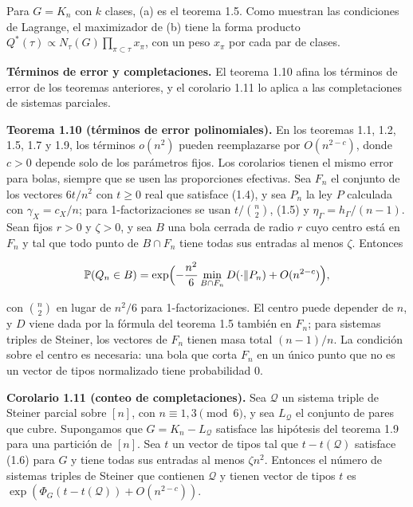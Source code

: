 \documentclass[spanish,11pt,a4paper]{article}
\begin{document}
Para \(G=K_n\) con \(k\) clases, (a) es el teorema 1.5. Como muestran las condiciones de Lagrange, el maximizador de (b) tiene la forma producto \(Q^*(\tau)\propto N_\tau(G)\prod_{\pi\subset\tau}x_\pi\), con un peso \(x_\pi\) por cada par de clases.

\textbf{Términos de error y completaciones.} El teorema 1.10 afina los términos de error de los teoremas anteriores, y el corolario 1.11 lo aplica a las completaciones de sistemas parciales.

\textbf{Teorema 1.10 (términos de error polinomiales).} En los teoremas 1.1, 1.2, 1.5, 1.7 y 1.9, los términos \(o(n^2)\) pueden reemplazarse por \(O(n^{2-c})\), donde \(c>0\) depende solo de los parámetros fijos. Los corolarios tienen el mismo error para bolas, siempre que se usen las proporciones efectivas. Sea \(F_n\) el conjunto de los vectores \(6t/n^2\) con \(t\ge0\) real que satisface (1.4), y sea \(P_n\) la ley \(P\) calculada con \(\gamma_X=c_X/n\); para 1-factorizaciones se usan \(t/\binom n2\), (1.5) y \(\eta_\Gamma=h_\Gamma/(n-1)\). Sean fijos \(r>0\) y \(\zeta>0\), y sea \(B\) una bola cerrada de radio \(r\) cuyo centro está en \(F_n\) y tal que todo punto de \(B\cap F_n\) tiene todas sus entradas al menos \(\zeta\). Entonces

\nopagebreak[4]
\[\mathbb P(Q_n\in B)=\exp\Bigl(-\frac{n^2}{6}\min_{B\cap F_n}D(\cdot\Vert P_n)+O(n^{2-c})\Bigr),\]

con \(\binom n2\) en lugar de \(n^2/6\) para 1-factorizaciones. El centro puede depender de \(n\), y \(D\) viene dada por la fórmula del teorema 1.5 también en \(F_n\); para sistemas triples de Steiner, los vectores de \(F_n\) tienen masa total \((n-1)/n\). La condición sobre el centro es necesaria: una bola que corta \(F_n\) en un único punto que no es un vector de tipos normalizado tiene probabilidad \(0\).

\textbf{Corolario 1.11 (conteo de completaciones).} Sea \(\mathcal Q\) un sistema triple de Steiner parcial sobre \([n]\), con \(n\equiv1,3\pmod 6\), y sea \(L_{\mathcal Q}\) el conjunto de pares que cubre. Supongamos que \(G=K_n-L_{\mathcal Q}\) satisface las hipótesis del teorema 1.9 para una partición de \([n]\). Sea \(t\) un vector de tipos tal que \(t-t(\mathcal Q)\) satisface (1.6) para \(G\) y tiene todas sus entradas al menos \(\zeta n^2\). Entonces el número de sistemas triples de Steiner que contienen \(\mathcal Q\) y tienen vector de tipos \(t\) es \(\exp(\Phi_G(t-t(\mathcal Q))+O(n^{2-c}))\).
\end{document}
